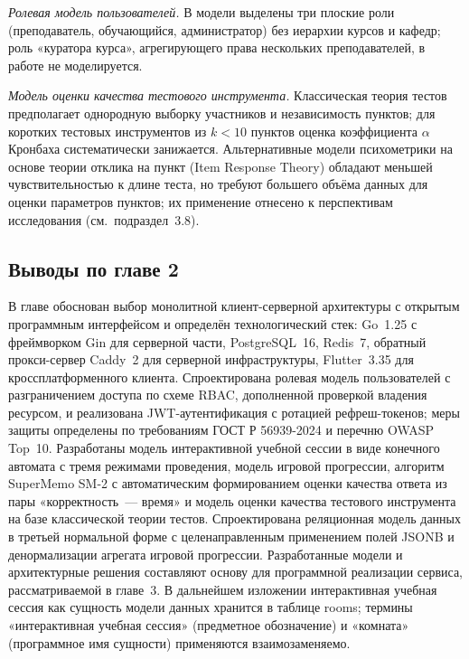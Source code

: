 \emph{Ролевая модель пользователей.} В модели выделены три плоские
роли (преподаватель, обучающийся, администратор) без иерархии
курсов и кафедр; роль «куратора курса», агрегирующего права
нескольких преподавателей, в работе не моделируется.

\emph{Модель оценки качества тестового инструмента.}
Классическая теория тестов предполагает однородную выборку
участников и независимость пунктов; для коротких тестовых
инструментов из $k < 10$ пунктов оценка коэффициента $\alpha$
Кронбаха систематически занижается. Альтернативные модели
психометрики на основе теории отклика на пункт (Item Response
Theory) обладают меньшей чувствительностью к длине теста, но
требуют большего объёма данных для оценки параметров пунктов;
их применение отнесено к перспективам исследования
(см.~подраздел~3.8).

\subsection*{\hspace*{1.25cm}Выводы по главе 2}

В главе обоснован выбор монолитной клиент-серверной архитектуры
с открытым программным интерфейсом и определён технологический
стек: Go~1.25 с фреймворком Gin для серверной части, PostgreSQL~16,
Redis~7, обратный прокси-сервер Caddy~2 для серверной инфраструктуры,
Flutter~3.35 для кроссплатформенного клиента. Спроектирована
ролевая модель пользователей с разграничением доступа по схеме
RBAC, дополненной проверкой владения ресурсом, и реализована
JWT-аутентификация с ротацией рефреш-токенов; меры защиты
определены по требованиям ГОСТ Р 56939-2024 и перечню OWASP
Top~10. Разработаны модель интерактивной учебной сессии в виде
конечного автомата с тремя режимами проведения, модель игровой
прогрессии, алгоритм SuperMemo SM-2 с автоматическим формированием
оценки качества ответа из пары «корректность~--- время» и модель
оценки качества тестового инструмента на базе классической теории
тестов. Спроектирована реляционная модель данных в третьей
нормальной форме с целенаправленным применением полей JSONB
и денормализации агрегата игровой прогрессии. Разработанные
модели и архитектурные решения составляют основу для программной
реализации сервиса, рассматриваемой в главе~3. В дальнейшем
изложении интерактивная учебная сессия как сущность модели
данных хранится в таблице rooms; термины «интерактивная учебная
сессия» (предметное обозначение) и «комната» (программное имя
сущности) применяются взаимозаменяемо.

\newpage
